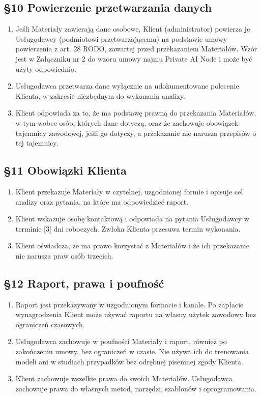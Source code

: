 \documentclass[11pt,a4paper]{article}
\begin{document}
\subsection*{§10 Powierzenie przetwarzania danych}
\begin{enumerate}
\item Jeśli Materiały zawierają dane osobowe, Klient (administrator) powierza je Usługodawcy (podmiotowi przetwarzającemu) na podstawie umowy powierzenia z art. 28 RODO, zawartej przed przekazaniem Materiałów. Wzór jest w Załączniku nr 2 do wzoru umowy najmu Private AI Node i może być użyty odpowiednio.
\item Usługodawca przetwarza dane wyłącznie na udokumentowane polecenie Klienta, w zakresie niezbędnym do wykonania analizy.
\item Klient odpowiada za to, że ma podstawę prawną do przekazania Materiałów, w tym wobec osób, których dane dotyczą, oraz że zachowuje obowiązek tajemnicy zawodowej, jeśli go dotyczy, a przekazanie nie narusza przepisów o tej tajemnicy.
\end{enumerate}

\subsection*{§11 Obowiązki Klienta}
\begin{enumerate}
\item Klient przekazuje Materiały w czytelnej, uzgodnionej formie i opisuje cel analizy oraz pytania, na które ma odpowiedzieć raport.
\item Klient wskazuje osobę kontaktową i odpowiada na pytania Usługodawcy w terminie [3] dni roboczych. Zwłoka Klienta przesuwa termin wykonania.
\item Klient oświadcza, że ma prawo korzystać z Materiałów i że ich przekazanie nie narusza praw osób trzecich.
\end{enumerate}

\subsection*{§12 Raport, prawa i poufność}
\begin{enumerate}
\item Raport jest przekazywany w uzgodnionym formacie i kanale. Po zapłacie wynagrodzenia Klient może używać raportu na własny użytek zawodowy bez ograniczeń czasowych.
\item Usługodawca zachowuje w poufności Materiały i raport, również po zakończeniu umowy, bez ograniczeń w czasie. Nie używa ich do trenowania modeli ani w studiach przypadków bez odrębnej pisemnej zgody Klienta.
\item Klient zachowuje wszelkie prawa do swoich Materiałów. Usługodawca zachowuje prawa do własnych metod, narzędzi, szablonów i oprogramowania.
\end{enumerate}
\end{document}
